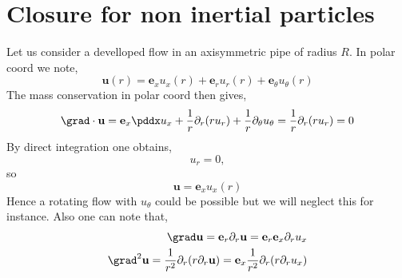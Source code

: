 \section{Closure for non inertial particles }

Let us consider a develloped flow in an axisymmetric pipe of radius $R$.
In polar coord we note,
\begin{equation}
    \textbf{u}(r)=\textbf{e}_x u_x(r) + \textbf{e}_r u_r(r)+ \textbf{e}_\theta u_\theta(r)
\end{equation}
The mass conservation in polar coord then gives,
\begin{equation}
    \grad \cdot \textbf{u} 
    = \textbf{e}_x \pddx u_x  
    + \frac{1}{r}\partial_r (r u_r) 
    + \frac{1}{r}\partial_\theta u_\theta
    = 
    \frac{1}{r}\partial_r (r u_r) 
    = 0
\end{equation}
By direct integration one obtains, 
\begin{equation}
    u_r = 0,
\end{equation}
so 
\begin{equation}
    \textbf{u}=\textbf{e}_x u_x(r)
\end{equation}
Hence a rotating flow with $u_\theta$ could be possible but we will neglect this for instance. 
Also one can note that,
\begin{align}
    \grad \textbf{u}
    =
    \textbf{e}_r \partial_r \textbf{u}
    =\textbf{e}_r\textbf{e}_x \partial_r u_x\\
    \grad^2 \textbf{u}
    =
    \frac{1}{r^2}\partial_r(r \partial_r \textbf{u}) 
    = 
    \textbf{e}_x \frac{1}{r^2}\partial_r(r \partial_r u_x) 
\end{align}

